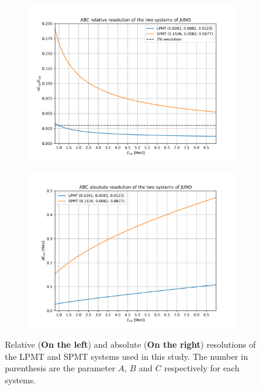\documentclass[../main.tex]{subfiles}
\begin{document}
\begin{figure}[ht]
  \centering
  \begin{subfigure}[t]{0.48\linewidth}
    \includegraphics[width=\linewidth]{scripts/plots/relative_resolution.png}
  \end{subfigure}
  \hfill
  \begin{subfigure}[t]{0.48\linewidth}
    \includegraphics[width=\linewidth]{scripts/plots/absolute_resolution.png}
  \end{subfigure}
  \caption{Relative (\textbf{On the left}) and absolute (\textbf{On the right}) resolutions of the LPMT and SPMT systems used in this study. The number in parenthesis are the parameter $A$, $B$ and $C$ respectively for each systems.}
  \label{fig:joint_fit:system_resolution}
\end{figure}
\end{document}
